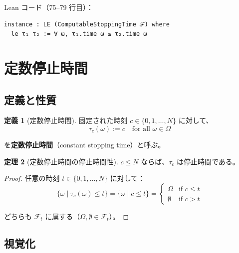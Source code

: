 \documentclass[12pt,a4paper,ja=standard]{bxjsarticle}
\theoremstyle{definition}
\newtheorem{definition}{定義}[section]
\newtheorem{theorem}[definition]{定理}
\begin{document}
Lean コード（75--79 行目）：
\begin{verbatim}
instance : LE (ComputableStoppingTime ℱ) where
  le τ₁ τ₂ := ∀ ω, τ₁.time ω ≤ τ₂.time ω
\end{verbatim}

\section{定数停止時間}\label{sec:const}

\subsection{定義と性質}

\begin{definition}[定数停止時間]
固定された時刻 $c \in \{0, 1, \ldots, N\}$ に対して、
\[
\tau_c(\omega) := c \quad \text{for all } \omega \in \Omega
\]

を\textbf{定数停止時間}（constant stopping time）と呼ぶ。
\end{definition}

\begin{theorem}[定数停止時間の停止時間性]
$c \leq N$ ならば、$\tau_c$ は停止時間である。
\end{theorem}

\begin{proof}
任意の時刻 $t \in \{0, 1, \ldots, N\}$ に対して：
\[
\{\omega \mid \tau_c(\omega) \leq t\} = \{\omega \mid c \leq t\} = 
\begin{cases}
\Omega & \text{if } c \leq t \\
\emptyset & \text{if } c > t
\end{cases}
\]

どちらも $\mathcal{F}_t$ に属する（$\Omega, \emptyset \in \mathcal{F}_t$）。
\end{proof}

\subsection{視覚化}

\begin{center}
\end{center}
\end{document}
